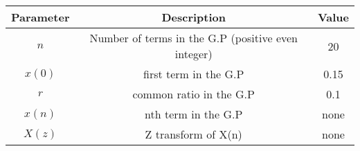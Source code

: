 \renewcommand{\arraystretch}{1.5}
\begin{tabular}{|c|c|c|}
\hline
Parameter & Description & Value \\\hline
\( n \) & Number of terms in the G.P (positive even integer)&20 \\\hline
\(x(0) \) & first term in the G.P&0.15 \\\hline
\( r \) & common ratio in the G.P& 0.1 \\\hline
\( x(n) \) & nth term in the G.P& none \\\hline
\( X(z) \) & Z transform of X(n)& none \\\hline
\end{tabular}
